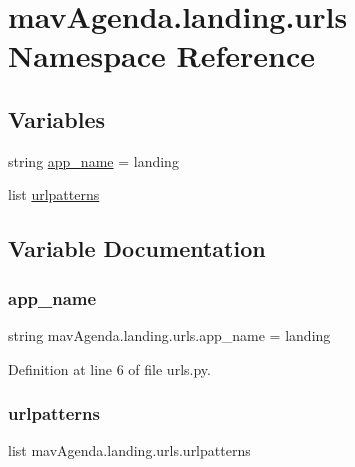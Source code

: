 \hypertarget{namespacemavAgenda_1_1landing_1_1urls}{}\section{mav\+Agenda.\+landing.\+urls Namespace Reference}
\label{namespacemavAgenda_1_1landing_1_1urls}
\subsection*{Variables}
\begin{DoxyCompactItemize}
\item 
string \mbox{\hyperlink{namespacemavAgenda_1_1landing_1_1urls_a4bc1db00cea15957f98970fab4609df2}{app\+\_\+name}} = \textquotesingle{}landing\textquotesingle{}
\item 
list \mbox{\hyperlink{namespacemavAgenda_1_1landing_1_1urls_a051f6413acbecd83be1f2869c7221337}{urlpatterns}}
\end{DoxyCompactItemize}


\subsection{Variable Documentation}
\mbox{\label{namespacemavAgenda_1_1landing_1_1urls_a4bc1db00cea15957f98970fab4609df2}} 
\subsubsection{\texorpdfstring{app\+\_\+name}{app\_name}}
{\footnotesize\ttfamily string mav\+Agenda.\+landing.\+urls.\+app\+\_\+name = \textquotesingle{}landing\textquotesingle{}}



Definition at line 6 of file urls.\+py.

\mbox{\label{namespacemavAgenda_1_1landing_1_1urls_a051f6413acbecd83be1f2869c7221337}} 
\subsubsection{\texorpdfstring{urlpatterns}{urlpatterns}}
{\footnotesize\ttfamily list mav\+Agenda.\+landing.\+urls.\+urlpatterns}

